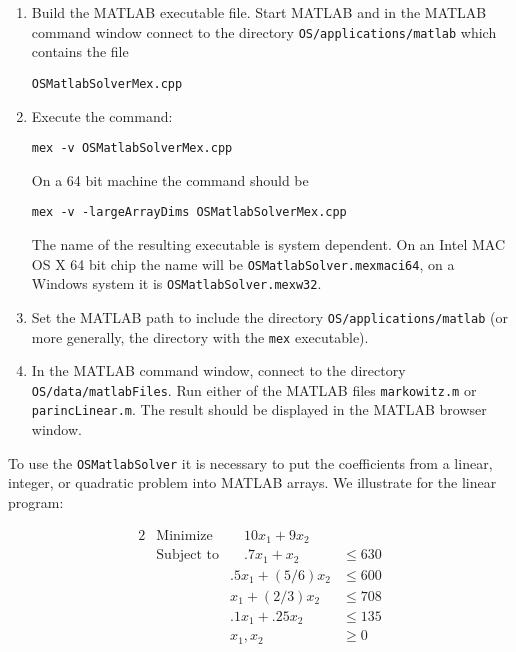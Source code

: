 \begin{enumerate}[{\bf Step 1:}]
\item{}  Build the MATLAB executable file. Start MATLAB and in the MATLAB command window connect to the directory {\tt OS/applications/matlab} which  contains the file 

\begin{verbatim}
OSMatlabSolverMex.cpp
\end{verbatim}

\item{} Execute the command:

\begin{verbatim}
mex -v OSMatlabSolverMex.cpp
\end{verbatim}

On a 64 bit machine the command should be

\begin{verbatim}
mex -v -largeArrayDims OSMatlabSolverMex.cpp
\end{verbatim}

The name of the resulting executable is system dependent. 
On an Intel MAC OS X 64 bit chip the name will be  {\tt OSMatlabSolver.mexmaci64}, 
on a Windows system it is {\tt OSMatlabSolver.mexw32}.  



\item{}  Set the MATLAB path to include the directory {\tt  OS/applications/matlab}  (or more generally, the directory with the {\tt mex} executable).


\item{}   In the MATLAB command window, connect to the directory {\tt OS/data/matlabFiles}. Run either of the MATLAB
files {\tt markowitz.m} or {\tt parincLinear.m}.  The result should be displayed in the MATLAB browser window.

\end{enumerate}


To use the {\tt OSMatlabSolver} it is necessary to put the coefficients  from a linear, integer, or quadratic problem into MATLAB arrays.   We illustrate for the linear program:

\begin{alignat}{2}
& \mbox{Minimize} & \quad
10 x_{1} + 9 x_{2}\label{eq:parinobj}\\
& \mbox{Subject to} & \quad .7x_{1} + x_{2}  &\le 630  \label{eq:parinccon1}\\
& & .5x_{1} + (5/6) x_{2} &\le 600 \label{eq:parinccon2}\\
& &  x_{1} + (2/3) x_{2} &\le 708 \label{eq:parinccon3}\\
& & .1x_{1} + .25 x_{2} &\le 135 \label{eq:parinccon4}\\
& & x_{1}, x_{2} &\ge 0 \label{eq:parincnonneg}
\end{alignat}

